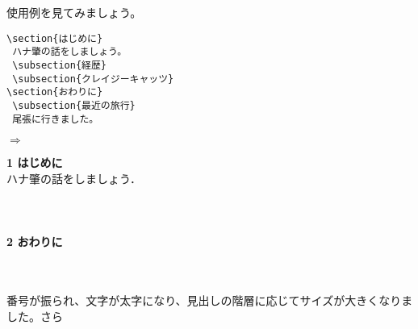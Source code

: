 使用例を見てみましょう。\\
\begin{minipage}[c]{.50\textwidth}
\begin{screen}
\small
\begin{verbatim}
\section{はじめに}
 ハナ肇の話をしましょう。
 \subsection{経歴}
 \subsection{クレイジーキャッツ}
\section{おわりに}
 \subsection{最近の旅行}
 尾張に行きました。
\end{verbatim}
\end{screen}
\end{minipage}
$\Rightarrow$
\begin{minipage}{.45\textwidth}
\begin{shadebox}
{\Large \textbf{1 はじめに}}\\
ハナ肇の話をしましょう．\\
\\
\\
\vspace*{-0.4zw}\\
{\Large \textbf{2 おわりに}}\\
\\
\hspace*{1em}{尾張に行きました．}
\end{shadebox}
\end{minipage}
\vspace*{1mm}\\
番号が振られ、文字が太字になり、見出しの階層に応じてサイズが大きくなりました。さら
